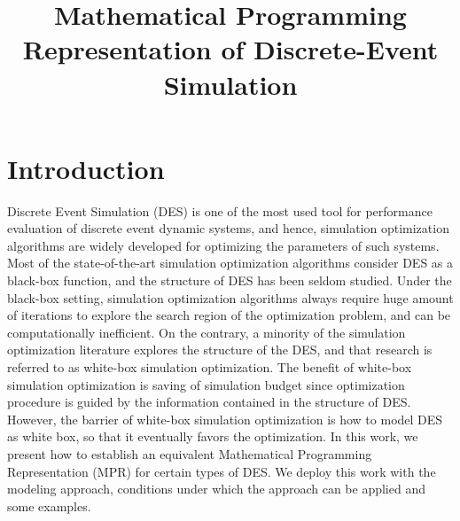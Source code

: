 \documentclass[]{interact}
\theoremstyle{plain}%
\theoremstyle{definition}
\theoremstyle{remark}
\begin{document}

\title{Mathematical Programming Representation of Discrete-Event Simulation}
\maketitle
\begin{abstract}

\end{abstract}

\section{Introduction}
Discrete Event Simulation (DES) is one of the most used tool for performance evaluation of discrete event dynamic systems, and hence, simulation optimization algorithms are widely developed for optimizing the parameters of such systems. Most of the state-of-the-art simulation optimization algorithms consider DES as a black-box function, and the structure of DES has been seldom studied. Under the black-box setting, simulation optimization algorithms always require huge amount of iterations to explore the search region of the optimization problem, and can be computationally inefficient. On the contrary, a minority of the simulation optimization literature explores the structure of the DES, and that research is referred to as white-box simulation optimization. The benefit of white-box simulation optimization is saving of simulation budget since optimization procedure is guided by the information contained in the structure of DES. However, the barrier of white-box simulation optimization is how to model DES as white box, so that it eventually favors the optimization. In this work, we present how to establish an equivalent Mathematical Programming Representation (MPR) for certain types of DES. We deploy this work with the modeling approach, conditions under which the approach can be applied and some examples. 

\end{document}
